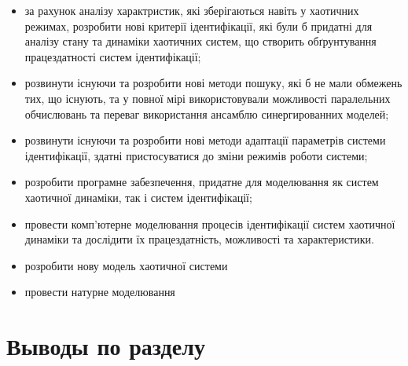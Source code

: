 \begin{itemize}

  \item
    за рахунок аналізу характристик, які зберігаються навіть
    у хаотичних режимах,
    розробити нові критерії ідентифікації,
    які були б придатні для аналізу стану та динаміки
    хаотичних систем, що створить обґрунтування працездатності систем
    ідентифікації;

  \item
  розвинути існуючи та розробити нові методи пошуку, які б не мали
  обмежень тих, що існують, та у повної мірі використовували можливості
  паралельних обчислювань та переваг використання ансамблю
  синергированних моделей;

  \item
  розвинути існуючи та розробити нові методи адаптації параметрів
  системи ідентифікації, здатні пристосуватися до зміни режимів роботи
  системи;

  \item
  розробити програмне забезпечення, придатне для моделювання як систем
  хаотичної динаміки, так і систем ідентифікації;

  \item
  провести комп'ютерне моделювання процесів ідентифікації систем
  хаотичної динаміки та дослідити їх працездатність, можливості та
  характеристики.

  \item
    розробити нову модель хаотичної системи

  \item
    провести натурне моделювання

\end{itemize}













\section{Выводы по разделу \thechapter}  %




